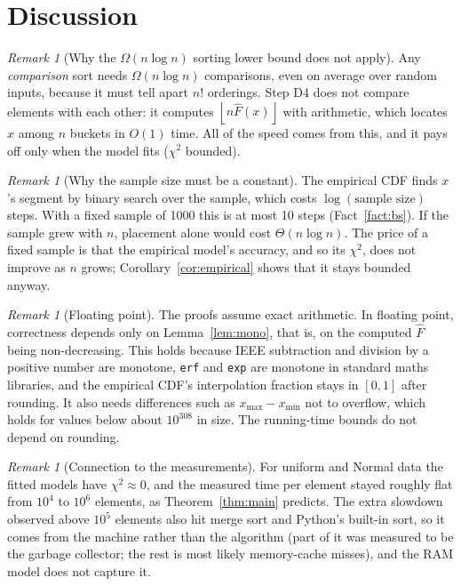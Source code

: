 \documentclass[11pt]{article}
\theoremstyle{definition}
\theoremstyle{remark}
\newtheorem{remark}[theorem]{Remark}
\newcommand{\Fh}{\widehat{F}}
\newcommand{\floor}[1]{\left\lfloor #1 \right\rfloor}
\newcommand{\code}[1]{\texttt{#1}}
\newcommand{\xmin}{x_{\min}}
\newcommand{\xmax}{x_{\max}}
\begin{document}
\section{Discussion}

\begin{remark}[Why the $\Omega(n\log n)$ sorting lower bound does not apply]
Any \emph{comparison} sort needs $\Omega(n\log n)$ comparisons, even on
average over random inputs, because it must tell apart $n!$ orderings. Step
D4 does not compare elements with each other: it computes $\floor{n\Fh(x)}$
with arithmetic, which locates $x$ among $n$ buckets in $O(1)$ time. All
of the speed comes from this, and it pays off only when the model fits
($\chi^2$ bounded).
\end{remark}

\begin{remark}[Why the sample size must be a constant]
The empirical CDF finds $x$'s segment by binary search over the sample,
which costs $\log(\text{sample size})$ steps. With a fixed sample of 1000
this is at most 10 steps (Fact~\ref{fact:bs}). If the sample grew with $n$,
placement alone would cost $\Theta(n\log n)$. The price of a fixed sample
is that the empirical model's accuracy, and so its $\chi^2$, does not
improve as $n$ grows; Corollary~\ref{cor:empirical} shows that it stays
bounded anyway.
\end{remark}

\begin{remark}[Floating point]\label{rem:float}
The proofs assume exact arithmetic. In floating point, correctness depends
only on Lemma~\ref{lem:mono}, that is, on the computed $\Fh$ being
non-decreasing. This holds because IEEE subtraction and division by a
positive number are monotone, \code{erf} and \code{exp} are monotone in
standard maths libraries, and the empirical CDF's interpolation fraction
stays in $[0,1]$ after rounding. It also needs differences such as
$\xmax-\xmin$ not to overflow, which holds for values below about
$10^{308}$ in size. The running-time bounds do not depend on rounding.
\end{remark}

\begin{remark}[Connection to the measurements]
For uniform and Normal data the fitted models have $\chi^2\approx0$, and the
measured time per element stayed roughly flat from $10^4$ to $10^6$
elements, as Theorem~\ref{thm:main} predicts. The extra slowdown observed
above $10^5$ elements also hit merge sort and Python's built-in sort, so it
comes from the machine rather than the algorithm (part of it was measured
to be the garbage collector; the rest is most likely memory-cache misses),
and the RAM model does not capture it.
\end{remark}
\end{document}
